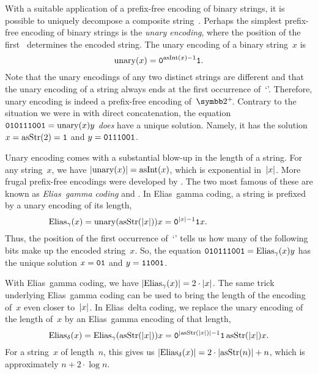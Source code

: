 With a suitable application of a prefix-free encoding of binary strings, it is possible to uniquely decompose a composite string~\parencite{cover2006elements}.
Perhaps the simplest prefix-free encoding of binary strings is the \emph{unary encoding}, where the position of the first~ determines the encoded string.
The unary encoding of a binary string~$x$ is
\begin{equation*}
  \operatorname{unary}(x) = \textnormal{\texttt{0}}^{\operatorname{asInt}(x) - 1} \textnormal{\texttt{1}}.
\end{equation*}
Note that the unary encodings of any two distinct strings are different and that the unary encoding of a string always ends at the first occurrence of~`'.
Therefore, unary encoding is indeed a prefix-free encoding of~$\binary^+\!$.
Contrary to the situation we were in with direct concatenation, the equation $\textnormal{\texttt{010111001}} = \operatorname{unary}(x)y$ \emph{does} have a unique solution.
Namely, it has the solution $x = \operatorname{asStr}(2) = \textnormal{\texttt{1}}$ and $y = \textnormal{\texttt{0111001}}$.

Unary encoding comes with a substantial blow-up in the length of a string.
For any string~$x$, we have ${\lvert\operatorname{unary}(x)\rvert} = \operatorname{asInt}(x)$, which is exponential in~${\lvert x\rvert}$.
More frugal prefix-free encodings were developed by \textcite{elias1975universal}.
The two most famous of these are known as \emph{Elias~gamma coding} and  \parencite[see also][]{sayood2017introduction}.
In Elias~gamma coding, a string is prefixed by a unary encoding of its length,
\begin{equation*}
  \mathrlap{
    \Elias_\gamma(x) \deq \unary(\asStr(\length{x})) x = \bits{0}^{\length{x} - 1} \bits{1} x.
  }\hphantom{
    \Elias_\delta(x) \deq \Elias_\gamma(\asStr(\length{x})) x = \bits{0}^{\length{\asStr(\length{x})} - 1} \bits{1} \asStr(\length{x}) x.
  }
\end{equation*}
Thus, the position of the first occurrence of~`' tells us how many of the following bits make up the encoded string~$x$.
So, the equation $\textnormal{\texttt{010111001}} = \operatorname{Elias}_\gamma(x)y$ has the unique solution $x = \textnormal{\texttt{01}}$ and $y = \textnormal{\texttt{11001}}$.

With Elias~gamma coding, we have ${\lvert\operatorname{Elias}_\gamma(x)\rvert} = 2 \cdot {\lvert x\rvert}$.
The same trick underlying Elias~gamma coding can be used to bring the length of the encoding of~$x$ even closer to~${\lvert x\rvert}$.
In Elias~delta coding, we replace the unary encoding of the length of~$x$ by an Elias~gamma encoding of that length,
\begin{equation*}
  \operatorname{Elias}_\delta(x) = \operatorname{Elias}_\gamma(\operatorname{asStr}({\lvert x\rvert})) x = \textnormal{\texttt{0}}^{{\lvert\operatorname{asStr}({\lvert x\rvert})\rvert} - 1} \textnormal{\texttt{1}} \operatorname{asStr}({\lvert x\rvert}) x.
\end{equation*}
For a string~$x$ of length~$n$, this gives us ${\lvert\operatorname{Elias}_\delta(x)\rvert} = 2 \cdot {\lvert\operatorname{asStr}(n)\rvert} + n$, which is approximately $n + 2 \cdot \log n$.


